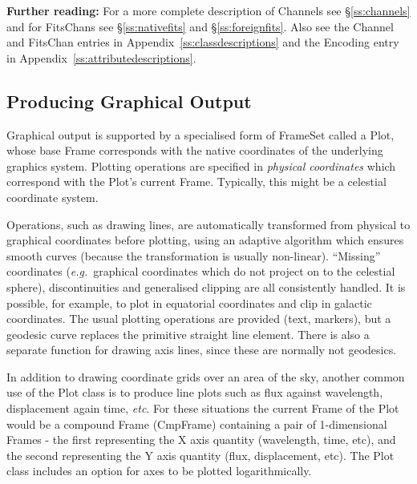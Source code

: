 \documentclass[twoside,11pt]{article}
\newcommand{\appref}[1]{Appendix~\ref{#1}}
\newcommand{\secref}[1]{\S\ref{#1}}
\newcommand{\appref}[1]{\ref{#1}}
\newcommand{\secref}[1]{\ref{#1}}
\begin{document}
{\bf{Further reading:}} For a more complete description of Channels
see \secref{ss:channels} and for FitsChans see \secref{ss:nativefits}
and \secref{ss:foreignfits}. Also see the Channel and FitsChan entries
in \appref{ss:classdescriptions} and the Encoding entry in
\appref{ss:attributedescriptions}.

\subsection{Producing Graphical Output}

Graphical output is supported by a specialised form of FrameSet called
a Plot, whose base Frame corresponds with the native coordinates of
the underlying graphics system.  Plotting operations are specified in
{\em{physical coordinates}} which correspond with the Plot's current
Frame. Typically, this might be a celestial coordinate system.

Operations, such as drawing lines, are automatically transformed from
physical to graphical coordinates before plotting, using an adaptive
algorithm which ensures smooth curves (because the transformation is
usually non-linear).  ``Missing'' coordinates ({\em{e.g.}}\ graphical
coordinates which do not project on to the celestial sphere),
discontinuities and generalised clipping are all consistently handled.
It is possible, for example, to plot in equatorial coordinates and
clip in galactic coordinates.  The usual plotting operations are
provided (text, markers), but a geodesic curve replaces the primitive
straight line element.  There is also a separate function for drawing
axis lines, since these are normally not geodesics.

In addition to drawing coordinate grids over an area of the sky, another
common use of the Plot class is to produce line plots such as flux
against wavelength, displacement again time, \emph{etc}. For these
situations the current Frame of the Plot would be a compound Frame
(CmpFrame) containing a pair of 1-dimensional Frames - the first
representing the X axis quantity (wavelength, time, etc), and the second
representing the Y axis quantity (flux, displacement, etc). The Plot
class includes an option for axes to be plotted logarithmically.
\end{document}
